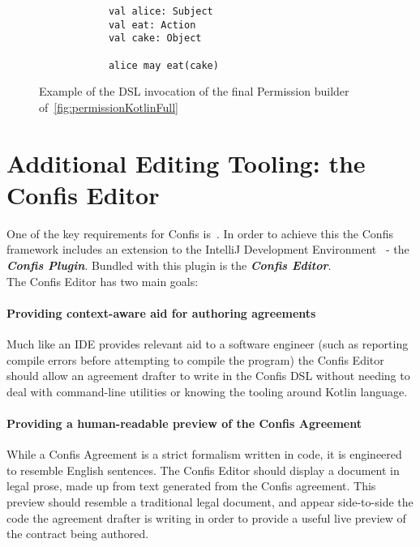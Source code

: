 \begin{figure}[h]
    \centering
    \begin{minipage}{0.5\textwidth}
        \begin{verbatim}
            val alice: Subject
            val eat: Action
            val cake: Object

            alice may eat(cake)
        \end{verbatim}
    \end{minipage}
    \caption{Example of the DSL invocation of the final Permission builder of~\autoref{fig:permissionKotlinFull}}
    \label{fig:finalPermissionInvocationDSL}
\end{figure}



\section[The Confis Editor]{Additional Editing Tooling: the Confis Editor}\label{sec:additional-dsl-tooling}

One of the key requirements for Confis is~.
In order to achieve this the Confis framework includes an extension to the IntelliJ Development Environment~\cite{intelliJRepo} - the \textbf{\emph{Confis Plugin}}.
Bundled with this plugin is the \textbf{\emph{Confis Editor}}.\\

The Confis Editor has two main goals:

\paragraph{Providing context-aware aid for authoring agreements} Much like an IDE provides relevant aid to a software engineer (such as reporting compile errors before attempting to compile the program) the Confis Editor should allow an agreement drafter to write in the Confis DSL without needing to deal with command-line utilities or knowing the tooling around Kotlin language.

\paragraph{Providing a human-readable preview of the Confis Agreement} While a Confis Agreement is a strict formalism written in code, it is engineered to resemble English sentences.
The Confis Editor should display a document in legal prose, made up from text generated from the Confis agreement.
This preview should resemble a traditional legal document, and appear side-to-side the code the agreement drafter is writing in order to provide a useful live preview of the contract being authored.


